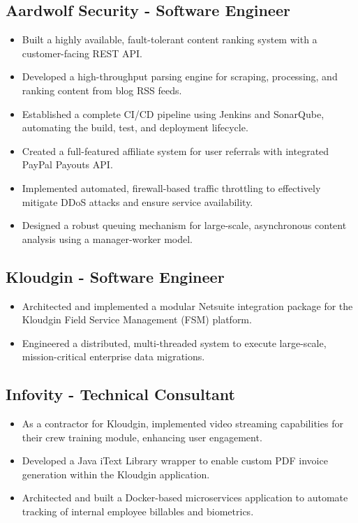 \documentclass[11pt]{article}
\begin{document}
\subsection{\textbf{Aardwolf Security} - Software Engineer  }
\begin{itemize}
    \item Built a highly available, fault-tolerant content ranking system with a customer-facing REST API.
    \item Developed a high-throughput parsing engine for scraping, processing, and ranking content from blog RSS feeds.
    \item Established a complete CI/CD pipeline using Jenkins and SonarQube, automating the build, test, and deployment lifecycle.
    \item Created a full-featured affiliate system for user referrals with integrated PayPal Payouts API.
    \item Implemented automated, firewall-based traffic throttling to effectively mitigate DDoS attacks and ensure service availability.
    \item Designed a robust queuing mechanism for large-scale, asynchronous content analysis using a manager-worker model.
\end{itemize}

\subsection{\textbf{Kloudgin} - Software Engineer  }
\begin{itemize}
    \item Architected and implemented a modular Netsuite integration package for the Kloudgin Field Service Management (FSM) platform.
    \item Engineered a distributed, multi-threaded system to execute large-scale, mission-critical enterprise data migrations.
\end{itemize}

\subsection{\textbf{Infovity} - Technical Consultant  }
\begin{itemize}
    \item As a contractor for Kloudgin, implemented video streaming capabilities for their crew training module, enhancing user engagement.
    \item Developed a Java iText Library wrapper to enable custom PDF invoice generation within the Kloudgin application.
    \item Architected and built a Docker-based microservices application to automate tracking of internal employee billables and biometrics.
\end{itemize}
\end{document}
